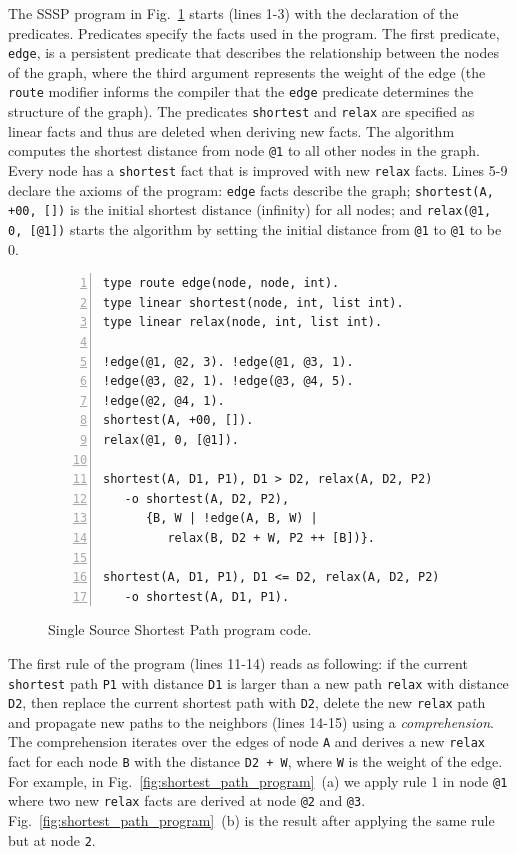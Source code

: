 The SSSP program in Fig.~\ref{code:shortest_path_program} starts (lines 1-3)
with the declaration of the predicates. Predicates specify the facts
used in the program. The first predicate, \texttt{edge}, is a persistent
predicate that describes the relationship between the nodes of the graph,
where the third argument represents the weight of the edge (the
\texttt{route} modifier informs the compiler that the \texttt{edge} predicate
determines the structure of the graph).
The predicates \texttt{shortest} and \texttt{relax} are
specified as linear facts and thus are deleted when deriving new facts.  The
algorithm computes the shortest distance from node
\texttt{@1} to all other nodes in the graph. Every node has a
\texttt{shortest} fact that is improved with new \texttt{relax} facts.  Lines
5-9 declare the axioms of the program: \texttt{edge} facts describe the
graph; \texttt{shortest(A, +00, [])} is the initial shortest distance
(infinity) for all nodes; and \texttt{relax(@1, 0, [@1])} starts the
algorithm by setting the initial distance from \texttt{@1} to \texttt{@1} to be
0.

\begin{figure}[h!]
\scriptsize\begin{Verbatim}[numbers=left]
type route edge(node, node, int).
type linear shortest(node, int, list int).
type linear relax(node, int, list int).

!edge(@1, @2, 3). !edge(@1, @3, 1).
!edge(@3, @2, 1). !edge(@3, @4, 5).
!edge(@2, @4, 1).
shortest(A, +00, []).
relax(@1, 0, [@1]).

shortest(A, D1, P1), D1 > D2, relax(A, D2, P2)
   -o shortest(A, D2, P2),
      {B, W | !edge(A, B, W) |
         relax(B, D2 + W, P2 ++ [B])}.

shortest(A, D1, P1), D1 <= D2, relax(A, D2, P2)
   -o shortest(A, D1, P1).
\end{Verbatim}
  \caption{Single Source Shortest Path program code.}
  \label{code:shortest_path_program}
\end{figure}
\normalsize

The first rule of the program (lines 11-14) reads as following: if the current
\texttt{shortest} path \texttt{P1} with distance \texttt{D1} is larger
than a new path \texttt{relax} with distance \texttt{D2}, then replace the
current shortest path with \texttt{D2}, delete the new \texttt{relax} path and
propagate new paths to the neighbors (lines 14-15) using a \emph{comprehension}.
The comprehension iterates over the edges of node \texttt{A} and derives a new
\texttt{relax} fact for each node \texttt{B} with the distance \texttt{D2 + W},
where \texttt{W} is the weight of the edge. For
example, in Fig.~\ref{fig:shortest_path_program}~(a) we apply rule 1 in node
\texttt{@1} where two new \texttt{relax} facts are derived at node \texttt{@2}
and \texttt{@3}. Fig.~\ref{fig:shortest_path_program}~(b) is the result after
applying the same rule but at node \texttt{2}.

